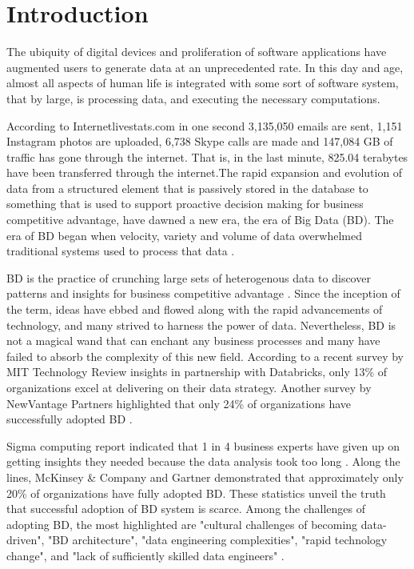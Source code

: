 \documentclass[runningheads]{llncs}
\begin{document}
\section{Introduction}
The ubiquity of digital devices and proliferation of software applications have augmented users to generate data at an unprecedented rate. In this day and age, almost all aspects of human life is integrated with some sort of software system, that by large, is processing data, and executing the necessary computations. 

According to Internetlivestats.com \cite{internet2019internet} in one second 3,135,050 emails are sent, 1,151 Instagram photos are uploaded, 6,738 Skype calls are made and 147,084 GB of traffic has gone through the internet. That is, in the last minute, 825.04 terabytes have been transferred through the internet.The rapid expansion and evolution of data from a structured element that is passively stored in the database to something that is used to support proactive decision making for business competitive advantage, have dawned a new era, the era of Big Data (BD). The era of BD began when velocity, variety and volume of data overwhelmed traditional systems used to process that data \cite{ataei2021neomycelia}\cite{AtaeiACIS}. 

BD is the practice of crunching large sets of heterogenous data to discover patterns and insights for business competitive advantage \cite{AtaeiHype}\cite{Huberty}. Since the inception of the term, ideas have ebbed and flowed along with the rapid advancements of technology, and many strived to harness the power of data. Nevertheless, BD is not a magical wand that can enchant any business processes and many have failed to absorb the complexity of this new field. According to a recent survey by MIT Technology Review insights in partnership with Databricks, only 13\% of organizations excel at delivering on their data strategy. Another survey by NewVantage Partners highlighted that only 24\% of organizations have successfully adopted BD \cite{NewVantageSurvey}. 

Sigma computing report indicated that 1 in 4 business experts have given up on getting insights they needed because the data analysis took too long \cite{SigmaSurvey}. Along the lines, McKinsey \& Company \cite{analytics2016age} and Gartner \cite{GartnerSury} demonstrated that approximately only 20\% of organizations have fully adopted BD. These statistics unveil the truth that successful adoption of BD system is scarce. Among the challenges of adopting BD, the most highlighted are "cultural challenges of becoming data-driven", "BD architecture", "data engineering complexities", "rapid technology change", and "lack of sufficiently skilled data engineers" \cite{sivarajah2017critical}\cite{AtaeiBigDataEnvirons}. 
\end{document}
